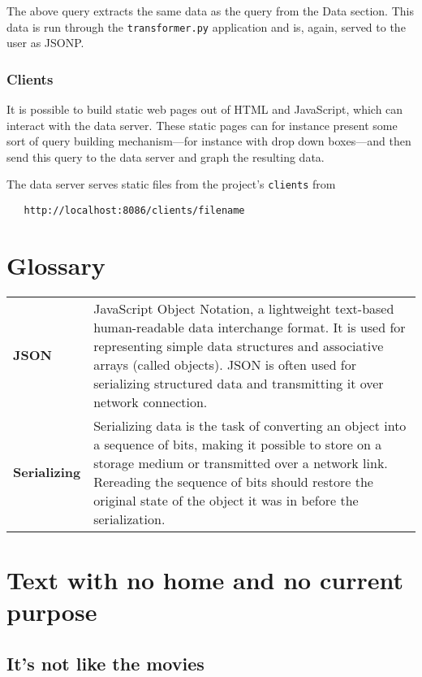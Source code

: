 \noindent The above query extracts the same data as the query from the Data
section. This data is run through the \texttt{transformer.py} application and
is, again, served to the user as JSONP.


\subsection*{Clients}

It is possible to build static web pages out of HTML and JavaScript, which
can interact with the data server. These static pages can for instance
present some sort of query building mechanism---for instance with drop down
boxes---and then send this query to the data server and graph the resulting
data.

The data server serves static files from the project's \texttt{clients} from

\begin{verbatim}
   http://localhost:8086/clients/filename
\end{verbatim}



\chapter{Glossary}

\begin{tabular}[t]{lp{100mm}}
\textbf{JSON} &
JavaScript Object Notation, a lightweight text-based human-readable data
interchange format. It is used for representing simple data structures and
associative arrays (called objects). JSON is often used for serializing
structured data and transmitting it over network connection.

 \\

\textbf{Serializing} &
Serializing data is the task of converting an object into a sequence of bits,
making it possible to store on a storage medium or transmitted over a network
link. Rereading the sequence of bits should restore the original state of the
object it was in before the serialization. \\
\end{tabular}


\chapter{Text with no home and no current purpose}

\section{It's not like the movies}

